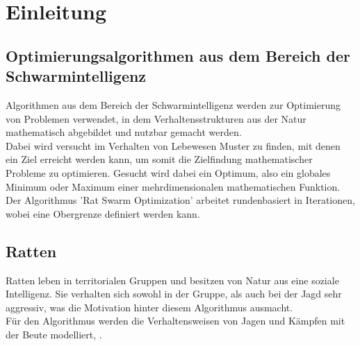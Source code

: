 \chapter{Einleitung}

\section{Optimierungsalgorithmen aus dem Bereich der Schwarmintelligenz}
Algorithmen aus dem Bereich der Schwarmintelligenz werden zur Optimierung von Problemen verwendet, in dem Verhaltensstrukturen aus der Natur mathematisch abgebildet und nutzbar gemacht werden.\\
Dabei wird versucht im Verhalten von Lebewesen Muster zu finden, mit denen ein Ziel erreicht werden kann, um somit die Zielfindung mathematischer Probleme zu optimieren. Gesucht wird dabei ein Optimum, also ein globales Minimum oder Maximum einer mehrdimensionalen mathematischen Funktion.\\
Der Algorithmus 'Rat Swarm Optimization' arbeitet rundenbasiert in Iterationen, wobei eine Obergrenze definiert werden kann.

\section{Ratten}
Ratten leben in territorialen Gruppen und besitzen von Natur aus eine soziale Intelligenz. Sie verhalten sich sowohl in der Gruppe, als auch bei der Jagd sehr aggressiv, was die Motivation hinter diesem Algorithmus ausmacht.\\
Für den Algorithmus werden die Verhaltensweisen von Jagen und Kämpfen mit der Beute modelliert, \cite[vgl. Gaurav Dhiman, S.2f]{dhiman_garg_nagar_kumar_dehghani_2020}.